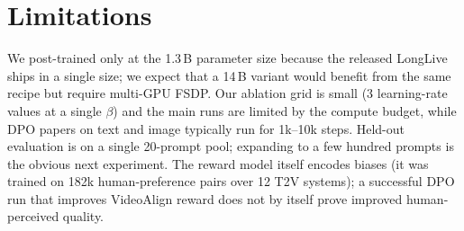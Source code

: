 \documentclass{article}
\begin{document}
\section{Limitations}
We post-trained only at the 1.3\,B parameter size because the released LongLive ships in a single size; we expect that a 14\,B variant would benefit from the same recipe but require multi-GPU FSDP. Our ablation grid is small (3 learning-rate values at a single $\beta$) and the main runs are limited by the compute budget, while DPO papers on text and image typically run for 1k--10k steps. Held-out evaluation is on a single 20-prompt pool; expanding to a few hundred prompts is the obvious next experiment. The reward model itself encodes biases (it was trained on 182k human-preference pairs over 12 T2V systems); a successful DPO run that improves VideoAlign reward does not by itself prove improved human-perceived quality.
\end{document}
